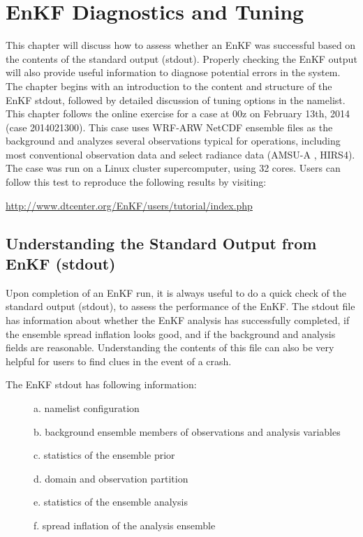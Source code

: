 \chapter{EnKF Diagnostics and Tuning}\label{enkf_diag}
\setlength{\parskip}{12pt}
This chapter will discuss how to assess whether an EnKF was successful based on the contents of the standard output (stdout). Properly checking the EnKF output will also provide useful information to diagnose potential errors in the system. The chapter begins with an introduction to the content and structure of the EnKF stdout, followed by detailed discussion of tuning options in the namelist.
This chapter follows the online exercise for a case at 00z on February 13th, 2014 (case 2014021300). This case uses WRF-ARW NetCDF ensemble files as the background and analyzes several observations typical for operations, including most conventional observation data and select radiance data (AMSU-A , HIRS4). The case was run on a Linux cluster supercomputer, using 32 cores. Users can follow this test to reproduce the following results by visiting:

\url{http://www.dtcenter.org/EnKF/users/tutorial/index.php}

\section{Understanding the Standard Output from EnKF (stdout)}

Upon completion of an EnKF run, it is always useful to do a quick check of the standard output (stdout), to assess the performance of the EnKF. The stdout file has information about whether the EnKF analysis has successfully completed, if the ensemble spread inflation looks good, and if the background and analysis fields are reasonable. Understanding the contents of this file can also be very helpful for users to find clues in the event of a crash.

The EnKF stdout has following information:
\begin{description}
\item[ ] a. namelist configuration
\item[ ] b. background ensemble members of observations and analysis variables
\item[ ] c. statistics of the ensemble prior
\item[ ] d. domain and observation partition
\item[ ] e. statistics of the ensemble analysis
\item[ ] f. spread inflation of the analysis ensemble
\end{description}

